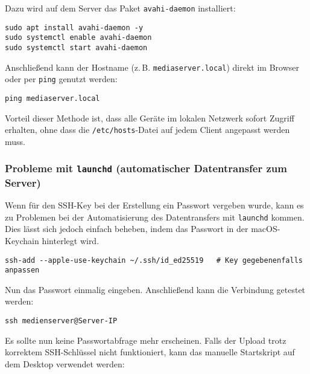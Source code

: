 \documentclass[12pt,a4paper]{report}
\begin{document}
\begin{enumerate}
      Dazu wird auf dem Server das Paket \texttt{avahi-daemon} installiert:

      \begin{verbatim}
sudo apt install avahi-daemon -y
sudo systemctl enable avahi-daemon
sudo systemctl start avahi-daemon
      \end{verbatim}

      Anschließend kann der Hostname (z.\,B. \texttt{mediaserver.local}) direkt im Browser oder per \texttt{ping} genutzt werden:

      \begin{verbatim}
ping mediaserver.local
      \end{verbatim}

      Vorteil dieser Methode ist, dass alle Geräte im lokalen Netzwerk sofort Zugriff erhalten, ohne dass die \texttt{/etc/hosts}-Datei auf jedem Client angepasst werden muss.
    \end{enumerate}


    \subsubsection*{Probleme mit \texttt{launchd} (automatischer Datentransfer zum Server)}
    Wenn für den SSH-Key bei der Erstellung ein Passwort vergeben wurde, kann es zu Problemen bei der Automatisierung des Datentransfers mit \texttt{launchd} kommen.  
    Dies lässt sich jedoch einfach beheben, indem das Passwort in der macOS-Keychain hinterlegt wird.

    \begin{verbatim}
ssh-add --apple-use-keychain ~/.ssh/id_ed25519   # Key gegebenenfalls anpassen
    \end{verbatim}

    Nun das Passwort einmalig eingeben. Anschließend kann die Verbindung getestet werden:

    \begin{verbatim}
ssh medienserver@Server-IP
    \end{verbatim}

    Es sollte nun keine Passwortabfrage mehr erscheinen.  
    Falls der Upload trotz korrektem SSH-Schlüssel nicht funktioniert, kann das manuelle Startskript auf dem Desktop verwendet werden:
\end{document}
